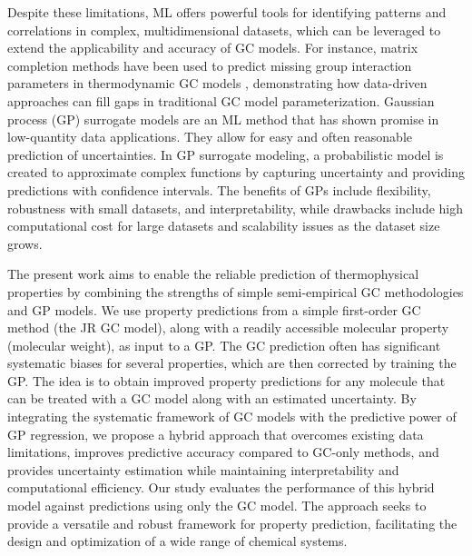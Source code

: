 \documentclass[journal=jacsat,manuscript=article, ]{achemso}
\begin{document}
Despite these limitations, ML offers powerful tools for identifying patterns and correlations in complex, multidimensional datasets, which can be leveraged to extend the applicability and accuracy of GC models. 
For instance, matrix completion methods have been used to predict missing group interaction parameters in thermodynamic GC models \cite{jirasekPredictionParametersGroup2023a}, demonstrating how data-driven approaches can fill gaps in traditional GC model parameterization.
Gaussian process (GP) surrogate models are an ML method that has shown promise in low-quantity data applications. They allow for easy and often reasonable prediction of uncertainties.  
In GP surrogate modeling, a probabilistic model is created to approximate complex functions by capturing uncertainty and providing predictions with confidence intervals. 
The benefits of GPs include flexibility, robustness with small datasets, and interpretability, while drawbacks include high computational cost for large datasets and scalability issues as the dataset size grows.

The present work aims to enable the reliable prediction of thermophysical properties by combining the strengths of simple semi-empirical GC methodologies and GP models.
We use property predictions from a simple first-order GC method (the JR GC model), along with a readily accessible molecular property (molecular weight), as input to a GP. 
The GC prediction often has significant systematic biases for several properties, which are then corrected by training the GP. 
The idea is to obtain improved property predictions for any molecule that can be treated with a GC model along with an estimated uncertainty. By integrating the systematic framework of GC models with the predictive power of GP regression, we propose a hybrid approach that overcomes existing data limitations, improves predictive accuracy compared to GC-only methods, and provides uncertainty estimation while maintaining interpretability and computational efficiency.
Our study evaluates the performance of this hybrid model against predictions using only the GC model. 
The approach seeks to provide a versatile and robust framework for property prediction, facilitating the design and optimization of a wide range of chemical systems.
\end{document}

